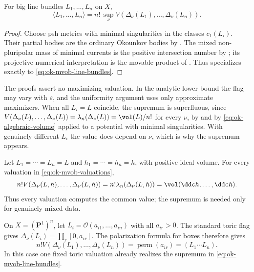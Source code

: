 \begin{theorem}\label{thm:ok-mvob-line-bundles}
For big line bundles $L_1,\ldots,L_n$ on $X$,
\[
 \langle L_1,\dots,L_n\rangle
 =n!\,\sup_\nu V\!\left(
     \Delta_\nu(L_1),\dots,\Delta_\nu(L_n)\right).
\tag{55.49}\label{eq:ok-mvob-line-bundles}
\]
\end{theorem}

\begin{proof}
Choose psh metrics with minimal singularities in the classes $c_1(L_i)$.
Their partial bodies are the ordinary Okounkov bodies by
.  The mixed non-pluripolar mass of
minimal currents is the positive intersection number by
\cite[Definition~1.17]{BEGZ10}; its projective numerical interpretation is
the movable product of \cite[Propositions~2.12--2.13]{BFJ09}.
Thus  specializes exactly to
\eqref{eq:ok-mvob-line-bundles}.
\end{proof}

\begin{remark}
\label{rem:ok-mvob-supremum}
The proofs assert no maximizing valuation.  In the analytic lower bound the
flag may vary with $\varepsilon$, and the uniformity argument uses only
approximate maximizers.  When all
$L_i=L$ coincide, the supremum is superfluous, since
$V(\Delta_\nu(L),\dots,\Delta_\nu(L))=\lambda_n(\Delta_\nu(L))
 =\vol(L)/n!$ for every $\nu$, by
 and by
\eqref{eq:ok-algebraic-volume} applied to a potential with minimal
singularities.  With genuinely different $L_i$ the value
does depend on $\nu$, which is why the supremum appears.
\end{remark}

\par\noindent\begin{minipage}{\linewidth}
\begin{example}\label{ex:ok-mvob-diagonal}
Let $L_1=\cdots=L_n=L$ and $h_1=\cdots=h_n=h$, with positive ideal
volume.  For every valuation in \eqref{eq:ok-mvob-valuations},
\[
 n!V(\Delta_\nu(L,h),\ldots,\Delta_\nu(L,h))
 =n!\lambda_n(\Delta_\nu(L,h))
 =\vol(\ddc h,\ldots,\ddc h).
\]
Thus every valuation computes the common value; the supremum is needed only
for genuinely mixed data.
\end{example}
\end{minipage}\par


\begin{example}\label{ex:ok-mvob-toric-boxes}
On $X=(\mathbf P^1)^n$, let
$L_i=\mathcal O(a_{i1},\ldots,a_{in})$ with all $a_{ir}>0$.  The
standard toric flag gives
$\Delta_\nu(L_i)=\prod_r[0,a_{ir}]$.  The polarization formula for boxes
therefore gives
\[
 n!V(\Delta_\nu(L_1),\ldots,\Delta_\nu(L_n))
 =\operatorname{perm}(a_{ir})=(L_1\cdots L_n).
\]
In this case one fixed toric valuation already realizes the supremum in
\eqref{eq:ok-mvob-line-bundles}.
\end{example}

